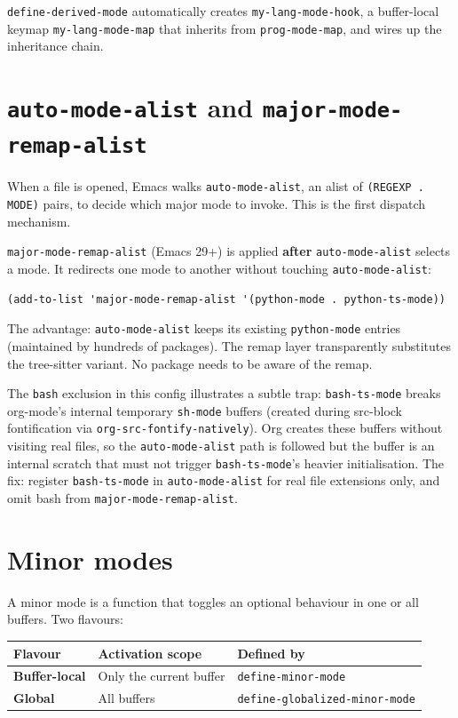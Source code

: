 \texttt{define-derived-mode} automatically creates \texttt{my-lang-mode-hook}, a buffer-local keymap \texttt{my-lang-mode-map} that inherits from \texttt{prog-mode-map}, and wires up the inheritance chain.

\section{\texttt{auto-mode-alist} and \texttt{major-mode-remap-alist}}\label{auto-mode-alist-and-major-mode-remap-alist}

When a file is opened, Emacs walks \texttt{auto-mode-alist}, an alist of \texttt{(REGEXP . MODE)} pairs, to decide which major mode to invoke. This is the first dispatch mechanism.

\texttt{major-mode-remap-alist} (Emacs 29+) is applied \textbf{after} \texttt{auto-mode-alist} selects a mode. It redirects one mode to another without touching \texttt{auto-mode-alist}:

\begin{verbatim}
(add-to-list 'major-mode-remap-alist '(python-mode . python-ts-mode))
\end{verbatim}

The advantage: \texttt{auto-mode-alist} keeps its existing \texttt{python-mode} entries (maintained by hundreds of packages). The remap layer transparently substitutes the tree-sitter variant. No package needs to be aware of the remap.

The \texttt{bash} exclusion in this config illustrates a subtle trap: \texttt{bash-ts-mode} breaks org-mode's internal temporary \texttt{sh-mode} buffers (created during src-block fontification via \texttt{org-src-fontify-natively}). Org creates these buffers without visiting real files, so the \texttt{auto-mode-alist} path is followed but the buffer is an internal scratch that must not trigger \texttt{bash-ts-mode}'s heavier initialisation. The fix: register \texttt{bash-ts-mode} in \texttt{auto-mode-alist} for real file extensions only, and omit bash from \texttt{major-mode-remap-alist}.

\section{Minor modes}\label{minor-modes}

A minor mode is a function that toggles an optional behaviour in one or all buffers. Two flavours:

\begin{longtable}[]{@{}lll@{}}
\toprule
Flavour & Activation scope & Defined by \\
\midrule
\textbf{Buffer-local} & Only the current buffer & \texttt{define-minor-mode} \\
\textbf{Global} & All buffers & \texttt{define-globalized-minor-mode} \\
\bottomrule
\end{longtable}

